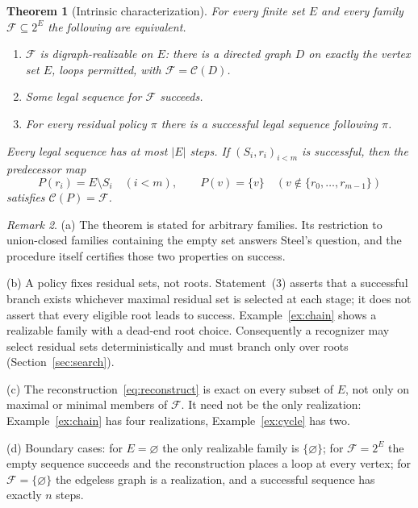 \documentclass[11pt,a4paper]{article}
\theoremstyle{plain}
\newtheorem{theorem}{Theorem}[section]
\theoremstyle{definition}
\theoremstyle{remark}
\newtheorem{remark}[theorem]{Remark}
\newcommand{\cC}{\mathcal C}
\newcommand{\cF}{\mathcal F}
\newcommand{\pw}[1]{2^{#1}}
\begin{document}
\begin{theorem}[Intrinsic characterization]\label{thm:main}
For every finite set $E$ and every family $\cF\subseteq\pw{E}$ the following are equivalent.
\begin{enumerate}[label=(\arabic*)]
\item $\cF$ is digraph-realizable on $E$: there is a directed graph $D$ on exactly the vertex set $E$, loops permitted, with $\cF=\cC(D)$.
\item Some legal sequence for $\cF$ succeeds.
\item For every residual policy $\pi$ there is a successful legal sequence following $\pi$.
\end{enumerate}
Every legal sequence has at most $|E|$ steps. If $(S_i,r_i)_{i<m}$ is successful, then the predecessor map
\begin{equation}\label{eq:reconstruct}
 P(r_i)=E\setminus S_i\quad(i<m),\qquad P(v)=\{v\}\quad(v\notin\{r_0,\dots,r_{m-1}\})
\end{equation}
satisfies $\cC(P)=\cF$.
\end{theorem}

\begin{remark}
(a) The theorem is stated for arbitrary families. Its restriction to union-closed families containing the empty set answers Steel's question, and the procedure itself certifies those two properties on success.

(b) A policy fixes residual sets, not roots. Statement~(3) asserts that a successful branch exists whichever maximal residual set is selected at each stage; it does not assert that every eligible root leads to success. Example~\ref{ex:chain} shows a realizable family with a dead-end root choice. Consequently a recognizer may select residual sets deterministically and must branch only over roots (Section~\ref{sec:search}).

(c) The reconstruction~\eqref{eq:reconstruct} is exact on every subset of $E$, not only on maximal or minimal members of $\cF$. It need not be the only realization: Example~\ref{ex:chain} has four realizations, Example~\ref{ex:cycle} has two.

(d) Boundary cases: for $E=\varnothing$ the only realizable family is $\{\varnothing\}$; for $\cF=\pw{E}$ the empty sequence succeeds and the reconstruction places a loop at every vertex; for $\cF=\{\varnothing\}$ the edgeless graph is a realization, and a successful sequence has exactly $n$ steps.
\end{remark}
\end{document}
